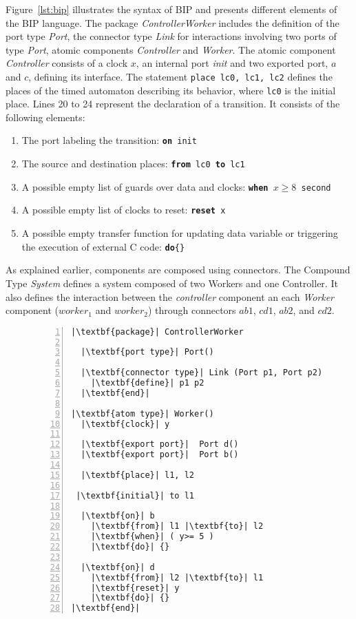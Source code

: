 \begin{example}\label{exp:bip}
Figure~\ref{lst:bip} illustrates the syntax of BIP and presents different elements of the BIP 
  language. The package \emph{ControllerWorker} includes the definition of the
  port type \emph{Port}, the connector type \emph{Link} for interactions involving two 
  ports of type \emph{Port}, atomic components \emph{Controller} and \emph{Worker}.
  The atomic component \emph{Controller} consists of a clock $x$, an internal port \emph{init}
  and two exported port, $a$ and $c$, defining its interface. The statement 
  \texttt{place lc0, lc1, lc2} defines the places of the timed automaton describing its behavior,
  where \texttt{lc0} is the initial place. Lines 20 to 24 represent the declaration of 
  a transition. It consists of the following elements:
  \begin{enumerate}
    \item The port labeling the transition: \texttt{\textbf{on} init}
    \item The source and destination places: \texttt{\textbf{from} lc0 \textbf{to} lc1}
    \item A possible empty list of guards over data and clocks: \texttt{\textbf{when} 
      $x\ge 8$ second}
    \item A possible empty list of clocks to reset: \texttt{\textbf{reset} x}
    \item A possible empty transfer function for updating data variable or triggering the 
      execution of external C code: \texttt{\textbf{do}\{\}}
  \end{enumerate} 

As explained earlier, components are composed using connectors. The Compound Type \emph{System}
defines a system composed of two Workers and one Controller. It also defines the interaction 
between the \emph{controller} component an each \emph{Worker} component ($worker_1$ and 
$worker_2$) through connectors $ab1$, $cd1$, $ab2$, and $cd2$.
\end{example}
\begin{figure}[H]
\begin{lstlisting}[basicstyle=\ttfamily,
escapeinside={||},
mathescape=true,
numbers=left,
backgroundcolor=\color{gray!20}]
|\textbf{package}| ControllerWorker

  |\textbf{port type}| Port()
  
  |\textbf{connector type}| Link (Port p1, Port p2)
    |\textbf{define}| p1 p2
  |\textbf{end}|

|\textbf{atom type}| Worker()
  |\textbf{clock}| y 
  
  |\textbf{export port}|  Port d()
  |\textbf{export port}|  Port b()
  
  |\textbf{place}| l1, l2
 
 |\textbf{initial}| to l1

  |\textbf{on}| b
    |\textbf{from}| l1 |\textbf{to}| l2
    |\textbf{when}| ( y>= 5 )
    |\textbf{do}| {}

  |\textbf{on}| d
    |\textbf{from}| l2 |\textbf{to}| l1
    |\textbf{reset}| y
    |\textbf{do}| {}
|\textbf{end}|

\end{lstlisting}
\end{figure}


